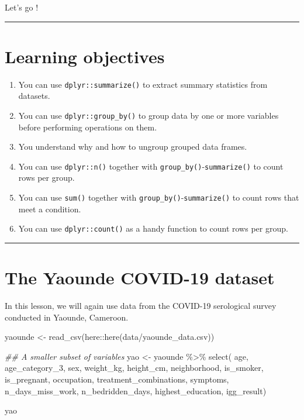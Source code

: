 \documentclass[
  letterpaper,
  DIV=11,
  numbers=noendperiod]{scrreprt}
\newenvironment{Shaded}{\begin{snugshade}}{\end{snugshade}}
\newcommand{\DocumentationTok}[1]{\textcolor[rgb]{0.37,0.37,0.37}{\textit{#1}}}
\newcommand{\FunctionTok}[1]{\textcolor[rgb]{0.28,0.35,0.67}{#1}}
\newcommand{\NormalTok}[1]{\textcolor[rgb]{0.00,0.23,0.31}{#1}}
\newcommand{\OtherTok}[1]{\textcolor[rgb]{0.00,0.23,0.31}{#1}}
\newcommand{\SpecialCharTok}[1]{\textcolor[rgb]{0.37,0.37,0.37}{#1}}
\newcommand{\StringTok}[1]{\textcolor[rgb]{0.13,0.47,0.30}{#1}}
\begin{document}
Let's go !

\begin{center}\rule{0.5\linewidth}{0.5pt}\end{center}

\hypertarget{learning-objectives-10}{%
\section{Learning objectives}\label{learning-objectives-10}}

\begin{enumerate}
\def\labelenumi{\arabic{enumi}.}
\item
  You can use \texttt{dplyr::summarize()} to extract summary statistics
  from datasets.
\item
  You can use \texttt{dplyr::group\_by()} to group data by one or more
  variables before performing operations on them.
\item
  You understand why and how to ungroup grouped data frames.
\item
  You can use \texttt{dplyr::n()} together with
  \texttt{group\_by()}-\texttt{summarize()} to count rows per group.
\item
  You can use \texttt{sum()} together with
  \texttt{group\_by()}-\texttt{summarize()} to count rows that meet a
  condition.
\item
  You can use \texttt{dplyr::count()} as a handy function to count rows
  per group.
\end{enumerate}

\begin{center}\rule{0.5\linewidth}{0.5pt}\end{center}

\hypertarget{the-yaounde-covid-19-dataset-2}{%
\section{The Yaounde COVID-19
dataset}\label{the-yaounde-covid-19-dataset-2}}

In this lesson, we will again use data from the COVID-19 serological
survey conducted in Yaounde, Cameroon.

\begin{Shaded}
\begin{Highlighting}[]
\NormalTok{yaounde }\OtherTok{\textless{}{-}} \FunctionTok{read\_csv}\NormalTok{(here}\SpecialCharTok{::}\FunctionTok{here}\NormalTok{(}\StringTok{\textquotesingle{}data/yaounde\_data.csv\textquotesingle{}}\NormalTok{))}

\DocumentationTok{\#\# A smaller subset of variables}
\NormalTok{yao }\OtherTok{\textless{}{-}}\NormalTok{ yaounde }\SpecialCharTok{\%\textgreater{}\%} \FunctionTok{select}\NormalTok{(}
\NormalTok{  age, age\_category\_3, sex, weight\_kg, height\_cm,}
\NormalTok{  neighborhood, is\_smoker, is\_pregnant, occupation,}
\NormalTok{  treatment\_combinations, symptoms, n\_days\_miss\_work, n\_bedridden\_days,}
\NormalTok{  highest\_education, igg\_result)}

\NormalTok{yao}
\end{Highlighting}
\end{Shaded}
\end{document}
